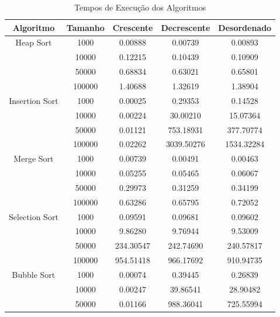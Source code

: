 \documentclass[12pt,a4paper]{article}
\begin{document}
\begin{table}[H]
    \centering
    \caption{Tempos de Execução dos Algoritmos}
    \label{tab:tempos}
    \begin{tabular}{@{}ccccc@{}}
        \toprule
        Algoritmo         & Tamanho & Crescente & Decrescente & Desordenado \\ \midrule
        Heap Sort         & 1000    & 0.00888   & 0.00739     & 0.00893     \\
                         & 10000   & 0.12215   & 0.10439     & 0.10909     \\
                         & 50000   & 0.68834   & 0.63021     & 0.65801     \\
                         & 100000  & 1.40688   & 1.32619     & 1.38904     \\ \midrule
        Insertion Sort    & 1000    & 0.00025   & 0.29353     & 0.14528     \\
                         & 10000   & 0.00224   & 30.00210    & 15.07364    \\
                         & 50000   & 0.01121   & 753.18931   & 377.70774   \\
                         & 100000  & 0.02262   & 3039.50276  & 1534.32284  \\ \midrule
        Merge Sort        & 1000    & 0.00739   & 0.00491     & 0.00463     \\
                         & 10000   & 0.05255   & 0.05465     & 0.06067     \\
                         & 50000   & 0.29973   & 0.31259     & 0.34199     \\
                         & 100000  & 0.63286   & 0.65795     & 0.72052     \\ \midrule
        Selection Sort    & 1000    & 0.09591   & 0.09681     & 0.09602     \\
                         & 10000   & 9.86280   & 9.76944     & 9.53009     \\
                         & 50000   & 234.30547 & 242.74690   & 240.57817   \\
                         & 100000  & 954.51418 & 966.17692   & 910.94735   \\ \midrule
        Bubble Sort       & 1000    & 0.00074   & 0.39445     & 0.26839     \\
                         & 10000   & 0.00247   & 39.86541    & 28.90482    \\
                         & 50000   & 0.01166   & 988.36041   & 725.55994   \\

\end{tabular}
\end{table}
\end{document}
